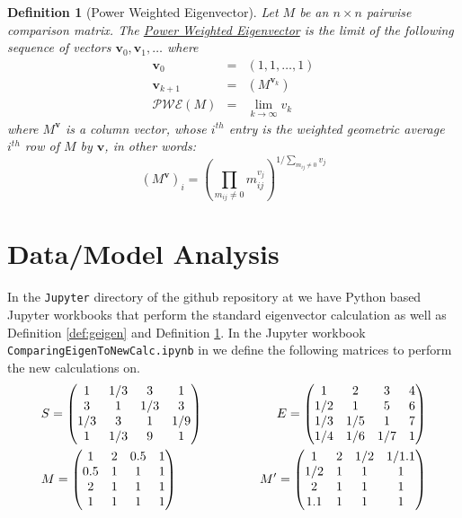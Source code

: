 \documentclass[11pt]{article}
\newtheorem{definition}{Definition}
\begin{document}
\begin{definition}[Power Weighted Eigenvector]
	\label{def:pweigen}
	Let $M$ be an $n \times n$ pairwise comparison matrix.  The 
	\ul{Power Weighted Eigenvector} is the limit of the following sequence of
	vectors $\mathbf{v}_0, \mathbf{v}_1, \ldots$ where
	\begin{eqnarray*}
		\mathbf{v}_0 &=& (1, 1, \ldots, 1) \\
		\mathbf{v}_{k+1} &=& (M ^ {\mathbf{v}_k}) \\
		\mathcal{PWE}(M) &=& \lim_{k\to \infty} v_k
	\end{eqnarray*}
	where $M ^{\mathbf{v}}$ is a column vector, whose $i^{th}$ entry
	is the weighted geometric average $i^{th}$ row of $M$ by $\mathbf{v}$, in
	other words:
	$$\left(M^{\mathbf{v}}\right)_i = \left(\prod_{m_{ij}\neq 0} m_{ij}^{v_j}\right) ^{1/\sum_{m_{ij}\neq 0} v_j} $$
	
\end{definition}

\section{Data/Model Analysis}
In the \texttt{Jupyter} directory of the github repository at \cite{githubahppri}
we have Python based Jupyter workbooks that perform the standard eigenvector 
calculation as well as Definition \ref{def:geigen} and Definition \ref{def:pweigen}.
In the Jupyter workbook \texttt{Comparing\-Eigen\-To\-New\-Calc\-.ipynb}
in \cite{githubahppri} we define the following matrices to perform the new calculations
on.
\begin{eqnarray*}
	&S =
	\begin{pmatrix}
		1 &  1/3 & 3 & 1 \\ 
 		3 & 1 & 1/3  & 3 \\ 
        1/3 & 3 & 1 & 1/9 \\ 
        1 & 1/3 & 9 & 1
	\end{pmatrix}&
	\hspace{0.5in} E =
	\begin{pmatrix}
	  1 &     2 &     3 &     4 \\
  	  1/2 &   1   &  5  &   6 \\
   	  1/3 & 1/5  &  1  &   7  \\
  	  1/4 & 1/6 &  1/7 &  1	
	\end{pmatrix}
	\\
	&M =
	\begin{pmatrix}
		1 &   2 &   0.5 &  1 \\
        0.5 & 1 &   1 &    1 \\
      	2 &   1 &   1 &    1 \\
 		1 &   1 &   1 &    1
	\end{pmatrix} &
	\hspace{0.5in}
	M' = 
	\begin{pmatrix}
        1 & 2 & 1/2 &  1/1.1 \\
        1/2 & 1 & 1 & 1 \\
        2 & 1 & 1 & 1 \\
        1.1 & 1 & 1 & 1		
	\end{pmatrix}
\end{eqnarray*}
\end{document}
